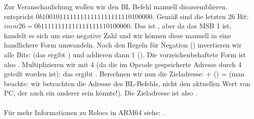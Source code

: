 Zur Veranschaulichung wollen wir den BL Befehl manuell disassemblieren.\\
 entspricht $0b10010111111111111111111110100000$.
Gemäß  sind  die letzten 26 Bit:\\
$imm26 = 0b11111111111111111110100000$.
Das ist , aber da das MSB 1 ist, handelt es sich um eine negative Zahl und wir können diese manuell in
eine handlichere Form umwandeln.
Nach den Regeln für Negation () invertieren wir alle Bits: (das ergibt
) und addieren dann 1 ().
Die vorzeichenbehaftete Form ist also .
Multiplizieren wir  mit 4 (da die im Opcode gespeicherte Adresse durch 4 geteilt worden ist): das ergibt
. 
Berechnen wir nun die Zieladresse:  + () =  (man beachte: wir betrachten die
Adresse des BL-Befehls, nicht den aktuellen Wert von \ac{PC}, der auch ein anderer sein könnte!).
Die Zieladresse ist also .\\\\
Für mehr Informationen zu Relocs in ARM64 siehe: \ARMELF.
